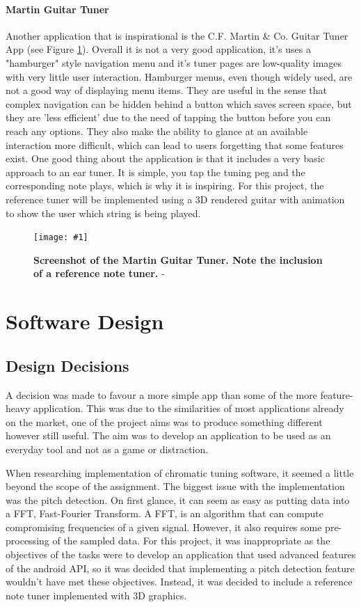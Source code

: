 \documentclass[conference]{acmsiggraph}
\newcommand{\figuremacroW}[4]{
	\begin{figure}[H] %
		\centering
		\texttt{[image: \#1]}
		\caption[#2]{\textbf{#2} - #3}
		\label{fig:#1}
	\end{figure}
}
\begin{document}
\paragraph{Martin Guitar Tuner} Another application that is inspirational is the C.F. Martin \& Co. Guitar Tuner App (see Figure \ref{fig:martinTuner}). Overall it is not a very good application, it's uses a "hamburger" style navigation menu and it's tuner pages are low-quality images with very little user interaction. Hamburger menus, even though widely used, are not a good way of displaying menu items. They are useful in the sense that complex navigation can be hidden behind a button which saves screen space, but they are 'less efficient' due to the need of tapping the button before you can reach any options. They also make the ability to glance at an available interaction more difficult, which can lead to users forgetting that some features exist. \cite{hamburger} One good thing about the application is that it includes a very basic approach to an ear tuner. It is simple, you tap the tuning peg and the corresponding note plays, which is why it is inspiring. For this project, the reference tuner will be implemented using a 3D rendered guitar with animation to show the user which string is being played.

\figuremacroW
{martinTuner}
{Screenshot of the Martin Guitar Tuner. Note the inclusion of a reference note tuner.}
{\protect\cite{Martin}}
{1.0}

\section{Software Design}

\subsection{Design Decisions}

A decision was made to favour a more simple app than some of the more feature-heavy application. This was due to the similarities of most applications already on the market, one of the project aims was to produce something different however still useful. The aim was to develop an application to be used as an everyday tool and not as a game or distraction.

When researching implementation of chromatic tuning software, it seemed a little beyond the scope of the assignment. The biggest issue with the implementation was the pitch detection. On first glance, it can seem as easy as putting data into a FFT, Fast-Fourier Transform. A FFT, is an algorithm that can compute compromising frequencies of a given signal. \cite{FFT} However, it also requires some pre-processing of the sampled data. For this project, it was inappropriate as the objectives of the tasks were to develop an application that used advanced features of the android API, so it was decided that implementing a pitch detection feature wouldn't have met these objectives. Instead, it was decided to include a reference note tuner implemented with 3D graphics.
\end{document}
